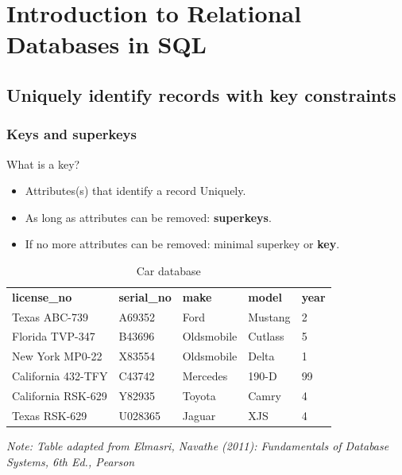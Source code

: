 \chapter{Introduction to Relational Databases in SQL}
\section{Uniquely identify records with key constraints}
\subsection{Keys and superkeys}

What is a key?
\begin{itemize}
    \item Attributes(s) that identify a record Uniquely.
    \item As long as attributes can be removed: \textbf{superkeys}.
    \item If no more attributes can be removed: minimal superkey or \textbf{key}.
\end{itemize}

\vspace{0.5em}
\begin{table}[ht]
    \centering
    \caption{Car database}
    \label{tab:carDB}
    \begin{tabular}{lllll}
\textbf{license\_no} & \textbf{serial\_no} & \textbf{make} & \textbf{model} & \textbf{year} \\
Texas ABC-739       & A69352              & Ford          & Mustang        & 2             \\
Florida TVP-347     & B43696              & Oldsmobile    & Cutlass        & 5             \\
New York MP0-22     & X83554              & Oldsmobile    & Delta          & 1             \\
California 432-TFY  & C43742              & Mercedes      & 190-D          & 99            \\
California RSK-629  & Y82935              & Toyota        & Camry          & 4             \\
Texas RSK-629       & U028365             & Jaguar        & XJS            & 4             \\
\end{tabular}
\end{table}

\emph{Note: Table adapted from Elmasri, Navathe (2011): Fundamentals of Database Systems, 6th Ed., Pearson}

